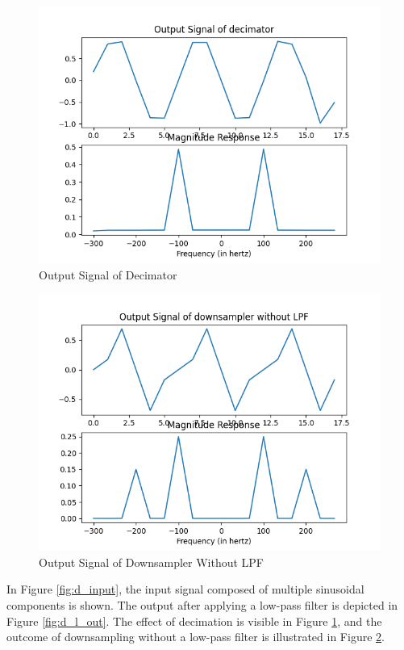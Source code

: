 \documentclass{article}
\begin{document}
\begin{figure}[ht]
  \centering
  \includegraphics[scale=0.5]{../figs/output_decimator.png}
  \caption{ Output Signal of Decimator}
  \label{fig:output_decimator}
\end{figure}
\begin{figure}[ht]
  \centering
  \includegraphics[scale=0.5]{../figs/output_downsampler.png}
  \caption{Output Signal of Downsampler Without LPF}
  \label{fig:output_downsampler}
\end{figure}
In Figure \ref{fig:d_input}, the input signal composed of multiple sinusoidal components is shown. The output after applying a low-pass filter is depicted in Figure \ref{fig:d_l_out}. The effect of decimation is visible in Figure \ref{fig:output_decimator}, and the outcome of downsampling without a low-pass filter is illustrated in Figure \ref{fig:output_downsampler}.
\end{document}
